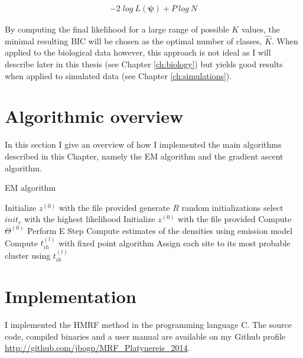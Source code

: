 \begin{align*}
\label{eq:BIC}
- 2\; log\:L(\boldsymbol{\psi}) + P\:log\:N
\end{align*}

By computing the final likelihood for a large range of possible $K$ values, the minimal resulting BIC will be chosen as the optimal number of classes, $\hat{K}$. When applied to the biological data however, this approach is not ideal as I will describe later in this thesis (see Chapter \ref{ch:biology}) but yields good results when applied to simulated data (see Chapter \ref{ch:simulations}).\\

\section{Algorithmic overview}
In this section I give an overview of how I implemented the main algorithms described in this Chapter, namely the EM algorithm and the gradient ascent algorithm.
\begin{algorithm}                      %
\caption{EM algorithm}          %
\label{alg1}                           %
\begin{algorithmic}                    %
		\STATE Initialize $z^{(0)}$ with the file provided
    \ELSE
    	\STATE generate $R$ random initializations 
    	\STATE select $init_r$ with the highest likelihood	
    	\STATE Initialize $z^{(0)}$ with the file provided
    \ENDIF
    \STATE Compute $\Theta^{(0)}$
		\STATE Perform E Step
			\STATE Compute estimates of the densities using emission model
			\STATE Compute $t_{ih}^{(l)}$ with fixed point algorithm
			\STATE Assign each site to its most probable cluster using $t_{ih}^{(l)}$
			
    \ENDWHILE
\end{algorithmic}
\end{algorithm}

\section{Implementation}
I implemented the HMRF method in the programming language C. The source code, compiled binaries and a user manual are available on my Github profile \url{http://github.com/jbogp/MRF_Platynereis_2014}.

